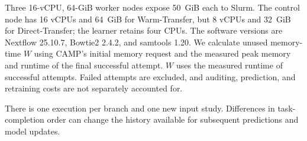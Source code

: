 Three 16-vCPU, 64-GiB worker nodes expose 50~GiB each to Slurm. The control
node has 16 vCPUs and 64~GiB for Warm-Transfer, but 8 vCPUs and 32~GiB for
Direct-Transfer; the learner retains four CPUs. The software versions are
Nextflow 25.10.7, Bowtie2 2.4.2, and samtools 1.20. We calculate unused memory-time $W$ using CAMP's initial memory request
and the measured peak memory and runtime of the final successful attempt.
$W$ uses the measured runtime of successful attempts. Failed attempts
are excluded, and auditing, prediction, and retraining costs are not
separately accounted for.

There is one execution per branch and one new input study. Differences
in task-completion order can change the history available for subsequent
predictions and model updates.
